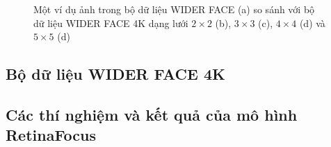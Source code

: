 {    \begin{figure}[H]
        \centering
        \caption{Một ví dụ ảnh trong bộ dữ liệu WIDER FACE \cite{yang2016wider} (a) so sánh với bộ dữ liệu WIDER FACE 4K dạng lưới $2 \times 2$ (b), $3 \times 3$ (c), $4 \times 4$ (d) và $5 \times 5$ (d)}
        \label{fig:widerface_4k_example}
    \end{figure}

    \subsection{Bộ dữ liệu WIDER FACE 4K}
    
    \widerfacefourk

    \subsection{Các thí nghiệm và kết quả của mô hình RetinaFocus}
    
    \retinafocusresults

}
